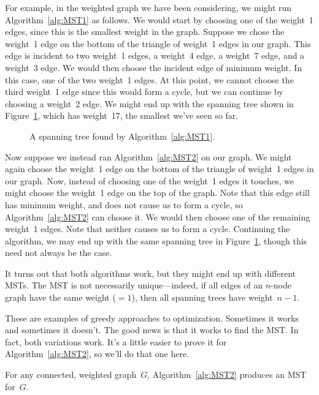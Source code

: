 For example, in the weighted graph we have been considering, we might
run Algorithm~\ref{alg:MST1} as follows.  We would start by choosing
one of the weight~1 edges, since this is the smallest weight in the
graph.  Suppose we chose the weight~1 edge on the bottom of the
triangle of weight~1 edges in our graph.  This edge is incident to two
weight~1 edges, a weight~4 edge, a weight~7 edge, and a weight~3
edge.  We would then choose the incident edge of minimum weight.  In
this case, one of the two weight~1 edges.  At this point, we cannot
choose the third weight~1 edge since this would form a cycle, but we
can continue by choosing a weight~2 edge.  We might end up with the
spanning tree shown in Figure~\ref{fig:5KC}, which has weight~17, the
smallest we've seen so far.

\begin{figure}


\caption{A spanning tree found by Algorithm~\ref{alg:MST1}.}

\label{fig:5KC}

\end{figure}

Now suppose we instead ran Algorithm~\ref{alg:MST2} on our graph.  We
might again choose the weight~1 edge on the bottom of the triangle of
weight~1 edges in our graph.  Now, instead of choosing one of the
weight~1 edges it touches, we might choose the weight~1 edge on the
top of the graph.  Note that this edge still has minimum weight, and
does not cause us to form a cycle, so Algorithm~\ref{alg:MST2} can
choose it.  We would then choose one of the remaining weight~1 edges.
Note that neither causes us to form a cycle.  Continuing the
algorithm, we may end up with the same spanning tree in
Figure~\ref{fig:5KC}, though this need not always be the case.

It turns out that both algorithms work, but they might end up with
different MSTs.  The MST is not necessarily unique---indeed, if all
edges of an $n$-node graph have the same weight (${}=1$), then all
spanning trees have weight~$n - 1$.

These are examples of greedy approaches to optimization.  Sometimes it
works and sometimes it doesn't.  The good news is that it works to
find the MST\@.  In fact, both variations work.  It's a little easier
to prove it for Algorithm~\ref{alg:MST2}, so we'll do that one here.

\begin{theorem}\label{thm:MST2}
For any connected, weighted graph~$G$, Algorithm~\ref{alg:MST2}
produces an MST for~$G$.
\end{theorem}

